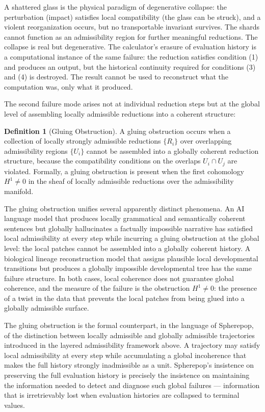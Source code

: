 \documentclass[12pt,openany]{book}
\theoremstyle{plain}
\theoremstyle{definition}
\newtheorem{definition}[theorem]{Definition}
\theoremstyle{remark}
\begin{document}
A shattered glass is the physical paradigm of degenerative collapse: the perturbation (impact) satisfies local compatibility (the glass can be struck), and a violent reorganization occurs, but no transportable invariant survives. The shards cannot function as an admissibility region for further meaningful reductions. The collapse is real but degenerative. The calculator's erasure of evaluation history is a computational instance of the same failure: the reduction satisfies condition (1) and produces an output, but the historical continuity required for conditions (3) and (4) is destroyed. The result cannot be used to reconstruct what the computation was, only what it produced.

The second failure mode arises not at individual reduction steps but at the global level of assembling locally admissible reductions into a coherent structure:

\begin{definition}[Gluing Obstruction]
A gluing obstruction occurs when a collection of locally strongly admissible reductions $\{R_i\}$ over overlapping admissibility regions $\{U_i\}$ cannot be assembled into a globally coherent reduction structure, because the compatibility conditions on the overlaps $U_i \cap U_j$ are violated. Formally, a gluing obstruction is present when the first cohomology $H^1 \neq 0$ in the sheaf of locally admissible reductions over the admissibility manifold.
\end{definition}

The gluing obstruction unifies several apparently distinct phenomena. An AI language model that produces locally grammatical and semantically coherent sentences but globally hallucinates a factually impossible narrative has satisfied local admissibility at every step while incurring a gluing obstruction at the global level: the local patches cannot be assembled into a globally coherent history. A biological lineage reconstruction model that assigns plausible local developmental transitions but produces a globally impossible developmental tree has the same failure structure. In both cases, local coherence does not guarantee global coherence, and the measure of the failure is the obstruction $H^1 \neq 0$: the presence of a twist in the data that prevents the local patches from being glued into a globally admissible surface.

The gluing obstruction is the formal counterpart, in the language of Spherepop, of the distinction between locally admissible and globally admissible trajectories introduced in the layered admissibility framework above. A trajectory may satisfy local admissibility at every step while accumulating a global incoherence that makes the full history strongly inadmissible as a unit. Spherepop's insistence on preserving the full evaluation history is precisely the insistence on maintaining the information needed to detect and diagnose such global failures — information that is irretrievably lost when evaluation histories are collapsed to terminal values.
\end{document}
